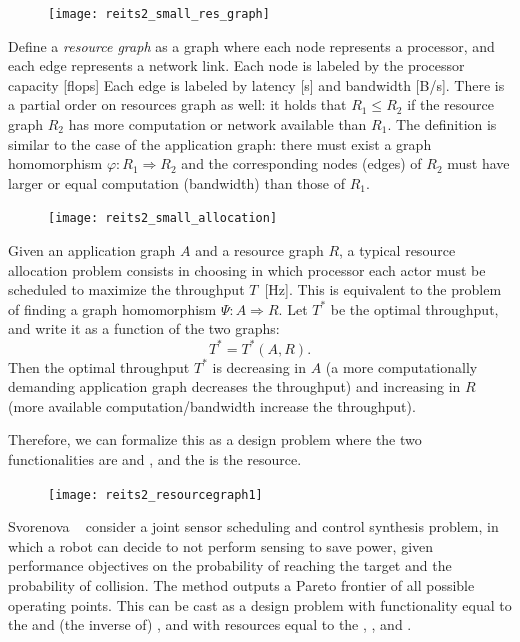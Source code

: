 \begin{figure}
\texttt{[image: reits2\_small\_res\_graph]}\end{figure}

Define a\emph{ resource graph} as a graph where each node represents
a processor, and each edge represents a network link. Each node is
labeled by the processor capacity [flops] Each edge is labeled
by latency [s] and bandwidth [B/s]. There is a partial order
on resources graph as well: it holds that $R_1 \leq R_2$ if
the resource graph $R_2$ has more computation or network available
than $R_1$. The definition is similar to the case of the application
graph: there must exist a graph homomorphism $\varphi:R_1  \Rightarrow R_2$
and the corresponding nodes (edges) of $R_2$ must have larger
or equal computation (bandwidth) than those of $R_1$.

\begin{figure}
\texttt{[image: reits2\_small\_allocation]}\end{figure}

Given an application graph $A$ and a resource graph $R$, a typical
resource allocation problem consists in choosing in which processor
each actor must be scheduled to maximize the throughput $T$~[Hz].
This is equivalent to the problem of finding a graph homomorphism $\Psi:A \Rightarrow R$.
Let $T^{\ast}$ be the optimal throughput, and write it as a function
of the two graphs:
\[
T^{\ast}=T^{\ast}(A,R).
\]
Then the optimal throughput $T^{*}$ is decreasing in $A$ (a more
computationally demanding application graph decreases the throughput)
and increasing in $R$ (more available computation/bandwidth increase
the throughput).

Therefore, we can formalize this as a design problem where the two
functionalities are  and , and the  is the
resource.

\begin{figure}

\texttt{[image: reits2\_resourcegraph1]}

\caption{}
\end{figure}



\begin{example}
Svorenova\,\,\etal~\cite{svorenova16resource} consider a joint
sensor scheduling and control synthesis problem, in which a robot
can decide to not perform sensing to save power, given performance
objectives on the probability of reaching the target and the probability
of collision. The method outputs a Pareto frontier of all possible
operating points. This can be cast as a design problem with functionality
equal to the  and (the inverse
of) , and with resources equal to the
, , and .
    
\end{example}

